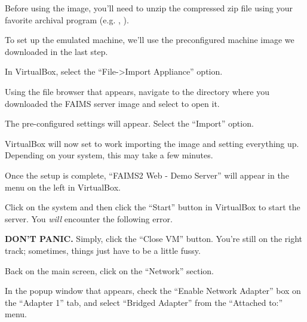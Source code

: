 Before using the image, you'll need to unzip the compressed zip file using your favorite archival program (e.g. \from[url6], \from[url7]).

{}

To set up the emulated machine, we'll use the preconfigured machine image we downloaded in the last step.

In VirtualBox, select the “File->Import Appliance” option.

{}

Using the file browser that appears, navigate to the directory where you downloaded the FAIMS server image and select to open it.

{}

The pre-configured settings will appear. Select the “Import” option.

{}

VirtualBox will now set to work importing the image and setting everything up. Depending on your system, this may take a few minutes.

{}

Once the setup is complete, “FAIMS2 Web - Demo Server” will appear in the menu on the left in VirtualBox.

{}

Click on the system and then click the “Start” button in VirtualBox to start the server. You {\em will} encounter the following error.

{}

{\bf DON'T PANIC.} Simply, click the “Close VM” button. You're still on the right track; sometimes, things just have to be a little fussy.

Back on the main screen, click on the “Network” section.

{}

In the popup window that appears, check the “Enable Network Adapter” box on the “Adapter 1” tab, and select “Bridged Adapter” from the “Attached to:” menu.

